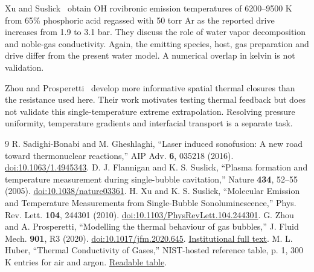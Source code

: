 \documentclass[10pt,a4paper]{article}
\begin{document}
Xu and Suslick~\cite{xu} obtain OH rovibronic emission temperatures of 6200--9500 K from 65\% phosphoric acid regassed with 50 torr Ar as the reported drive increases from 1.9 to 3.1 bar. They discuss the role of water vapor decomposition and noble-gas conductivity. Again, the emitting species, host, gas preparation and drive differ from the present water model. A numerical overlap in kelvin is not validation.

Zhou and Prosperetti~\cite{zhou} develop more informative spatial thermal closures than the resistance used here. Their work motivates testing thermal feedback but does not validate this single-temperature extreme extrapolation. Resolving pressure uniformity, temperature gradients and interfacial transport is a separate task.

\begin{thebibliography}{9}\small
{} R. Sadighi-Bonabi and M. Gheshlaghi, ``Laser induced sonofusion: A new road toward thermonuclear reactions,'' AIP Adv. \textbf{6}, 035218 (2016). \href{https://doi.org/10.1063/1.4945343}{doi:10.1063/1.4945343}.
 D. J. Flannigan and K. S. Suslick, ``Plasma formation and temperature measurement during single-bubble cavitation,'' Nature \textbf{434}, 52--55 (2005). \href{https://doi.org/10.1038/nature03361}{doi:10.1038/nature03361}.
 H. Xu and K. S. Suslick, ``Molecular Emission and Temperature Measurements from Single-Bubble Sonoluminescence,'' Phys. Rev. Lett. \textbf{104}, 244301 (2010). \href{https://doi.org/10.1103/PhysRevLett.104.244301}{doi:10.1103/PhysRevLett.104.244301}.
 G. Zhou and A. Prosperetti, ``Modelling the thermal behaviour of gas bubbles,'' J. Fluid Mech. \textbf{901}, R3 (2020). \href{https://doi.org/10.1017/jfm.2020.645}{doi:10.1017/jfm.2020.645}. \href{https://ris.utwente.nl/ws/files/240998140/Zhou2020modelling.pdf}{Institutional full text}.
 M. L. Huber, ``Thermal Conductivity of Gases,'' NIST-hosted reference table, p. 1, 300 K entries for air and argon. \href{https://tsapps.nist.gov/publication/get_pdf.cfm?pub_id=926438}{Readable table}.
\end{thebibliography}

\newpage\appendix
\end{document}
